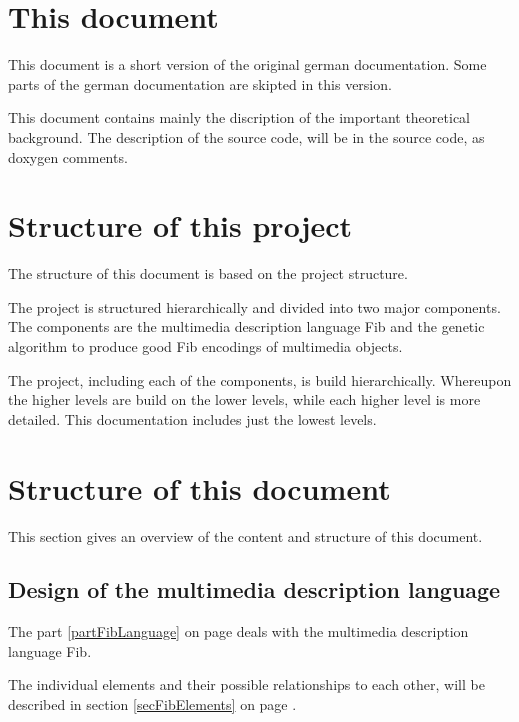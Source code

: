 \documentclass[11pt,a4paper]{article}
\begin{document}
\section{This document}

This document is a short version of the original german documentation. Some parts of the german documentation are skipted in this version.

This document contains mainly the discription of the important theoretical background. The description of the source code, will be in the source code, as doxygen comments.



\section{Structure of this project}

The structure of this document is based on the project structure.

The project is structured hierarchically and divided into two major components.
The components are the multimedia description language Fib and the genetic algorithm to produce good Fib encodings of multimedia objects.

The project, including each of the components, is build hierarchically. Whereupon the higher levels are build on the lower levels, while each higher level is more detailed. This documentation includes just the lowest levels.



\section{Structure of this document}

This section gives an overview of the content and structure of this document.



\subsection{Design of the multimedia description language}

The part \ref{partFibLanguage} on page \pageref{partFibLanguage} deals with the multimedia description language Fib.

The individual elements and their possible relationships to each other, will be described in section \ref{secFibElements} on page \pageref{secFibElements} .
\end{document}
